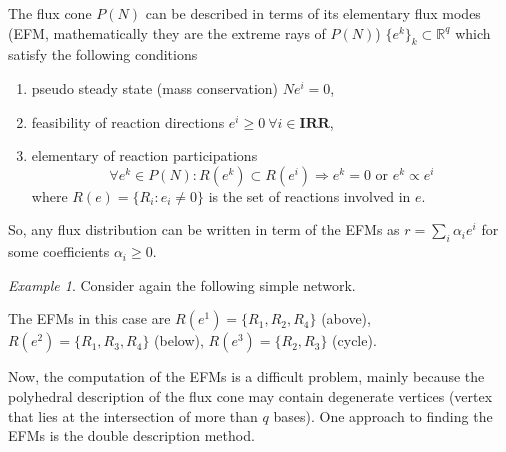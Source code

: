 \documentclass[a4paper]{article}
\theoremstyle{plain}
\theoremstyle{definition}
\theoremstyle{remark}
\newtheorem*{example}{Example}
\begin{document}
The flux cone $P(N)$ can be described in terms of its elementary flux modes
(EFM, mathematically they are the extreme rays of $P(N)$) $\{e^k\}_k \subset
\mathbb{R}^q$ which satisfy the following conditions
\begin{enumerate}
  \item pseudo steady state (mass conservation) $Ne^i = 0$,
  \item feasibility of reaction directions $e^i \geq 0 ~ \forall i \in \mathbf{IRR}$,
  \item elementary of reaction participations
    \[
      \forall e^k \in P(N) : R(e^k) \subset R(e^i) \Rightarrow e^k = 0 \text{ or }
      e^k \propto e^i
    \]
    where $R(e) = \{R_i : e_i \neq 0\}$ is the set of reactions involved in
    $e$.
\end{enumerate}
So, any flux distribution can be written in term of the EFMs as
$r = \sum_i \alpha_i e^i$ for some coefficients $\alpha_i \geq 0$.

\begin{example} Consider again the following simple network.
  \begin{center}
  \end{center}
  The EFMs in this case are $R(e^1) = \{R_1, R_2, R_4\}$ (above), $R(e^2) =
  \{R_1, R_3, R_4\}$ (below), $R(e^3) = \{R_2, R_3\}$ (cycle).
\end{example}

Now, the computation of the EFMs is a difficult problem, mainly because the
polyhedral description of the flux cone may contain degenerate vertices
(vertex that lies at the intersection of more than $q$ bases). One approach to
finding the EFMs is the double description method.
\end{document}
